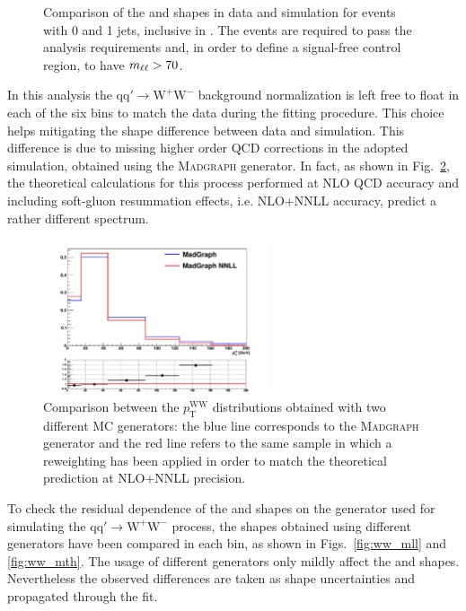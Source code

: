 \begin{figure}[!htb]
\caption{Comparison of the \mll and \mt shapes in data and simulation for events with 0 and 1 jets, inclusive in \pth. The events are required to pass the analysis requirements and, in order to define a signal-free control region, to have $m_{\ell\ell} > 70$\GeV.\label{fig:WW}}
\end{figure}

In this analysis the $\mathrm{qq'\to W^{+}W^{-}}$ background normalization is left free to float in each of the six \pth bins to match the data during the fitting procedure. This choice helps mitigating the \pth shape difference between data and simulation. This difference is due to missing higher order QCD corrections in the adopted simulation, obtained using the \textsc{Madgraph} generator. In fact, as shown in Fig.~\ref{fig:ww_wwnlo}, the theoretical calculations for this process performed at NLO QCD accuracy and including soft-gluon resummation effects, i.e. NLO+NNLL accuracy, predict a rather different \pth spectrum.

\begin{figure}[htb]
\centering
\includegraphics[width=0.6\textwidth]{images/WWnlo/WW_WWnlo-v2.pdf}
\caption{Comparison between the $p_\mathrm{T}^\mathrm{WW}$ distributions obtained with two different MC generators: the blue line corresponds to the \textsc{Madgraph} generator and the red line refers to the same sample in which a reweighting has been applied in order to match the theoretical prediction at NLO+NNLL precision. }\label{fig:ww_wwnlo}
\end{figure}

To check the residual dependence of the \mll and \mt shapes on the generator used for simulating the $\mathrm{qq'\to W^{+}W^{-}}$ process, the shapes obtained using different generators have been compared in each \pth bin, as shown in Figs.~\ref{fig:ww_mll} and \ref{fig:ww_mth}. The usage of different generators only mildly affect the \mll and \mt shapes. Nevertheless the observed differences are taken as shape uncertainties and propagated through the fit.

